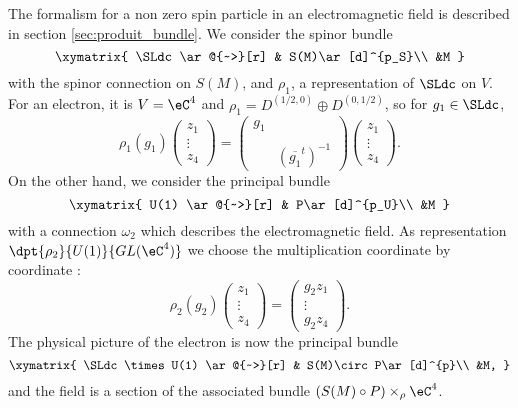 The formalism for a non zero spin particle in an electromagnetic field is described in section \ref{sec:produit_bundle}. We consider the spinor bundle
\[
\xymatrix{
    \SLdc \ar@{~>}[r] & S(M)\ar[d]^{p_S}\\ &M 
  }
\]
with the spinor connection on $S(M)$, and $\rho_1$, a representation of $\SLdc$ on $V$. For an electron, it is $V=\eC^4$ and $\rho_1=D^{(1/2,0)}\oplus D^{(0,1/2)}$, so for $g_1\in\SLdc$,
\begin{equation}
  \rho_1(g_1)\begin{pmatrix}
  z_1\\\vdots\\z_4
             \end{pmatrix}
=
\begin{pmatrix}
  g_1\\\\
&(\overline{g_1}^t)^{-1}
\end{pmatrix}
\begin{pmatrix}
  z_1\\\vdots\\z_4
             \end{pmatrix}.
\end{equation}
On the other hand, we consider the principal bundle
\[
\xymatrix{
    U(1) \ar@{~>}[r] & P\ar[d]^{p_U}\\ &M 
  }
\]
with a connection $\omega_2$ which describes the electromagnetic field. As representation $\dpt{\rho_2}{U(1)}{GL(\eC^4)}$ we choose the multiplication coordinate by coordinate :
\begin{equation}
\rho_2(g_2)\begin{pmatrix}
  z_1\\\vdots\\z_4
             \end{pmatrix}
=
\begin{pmatrix}
  g_2z_1\\\vdots\\g_2z_4
             \end{pmatrix}.
\end{equation}
The physical picture of the electron is now the principal bundle
\[
\xymatrix{
    \SLdc\times U(1) \ar@{~>}[r] & S(M)\circ P\ar[d]^{p}\\ &M,
  }
\]
and the field is a section of the associated bundle $(S(M)\circ P)\times_{\rho}\eC^4$.
